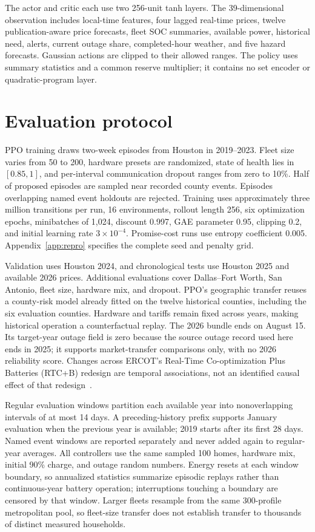 The actor and critic each use two 256-unit tanh layers. The 39-dimensional observation includes local-time features, four lagged real-time prices, twelve publication-aware price forecasts, fleet SOC summaries, available power, historical need, alerts, current outage share, completed-hour weather, and five hazard forecasts. Gaussian actions are clipped to their allowed ranges. The policy uses summary statistics and a common reserve multiplier; it contains no set encoder or quadratic-program layer.

\section{Evaluation protocol}
\label{sec:protocol}

PPO training draws two-week episodes from Houston in 2019--2023. Fleet size varies from 50 to 200, hardware presets are randomized, state of health lies in $[0.85,1]$, and per-interval communication dropout ranges from zero to 10\%. Half of proposed episodes are sampled near recorded county events. Episodes overlapping named event holdouts are rejected. Training uses approximately three million transitions per run, 16 environments, rollout length 256, six optimization epochs, minibatches of 1,024, discount 0.997, GAE parameter 0.95, clipping 0.2, and initial learning rate $3\times10^{-4}$. Promise-cost runs use entropy coefficient 0.005. Appendix~\ref{app:repro} specifies the complete seed and penalty grid.

Validation uses Houston 2024, and chronological tests use Houston 2025 and available 2026 prices. Additional evaluations cover Dallas--Fort Worth, San Antonio, fleet size, hardware mix, and dropout. PPO's geographic transfer reuses a county-risk model already fitted on the twelve historical counties, including the six evaluation counties. Hardware and tariffs remain fixed across years, making historical operation a counterfactual replay. The 2026 bundle ends on August 15. Its target-year outage field is zero because the source outage record used here ends in 2025; it supports market-transfer comparisons only, with no 2026 reliability score. Changes across ERCOT's Real-Time Co-optimization Plus Batteries (RTC+B) redesign are temporal associations, not an identified causal effect of that redesign~\citep{ercot_rtcb_2025}.

Regular evaluation windows partition each available year into nonoverlapping intervals of at most 14 days. A preceding-history prefix supports January evaluation when the previous year is available; 2019 starts after its first 28 days. Named event windows are reported separately and never added again to regular-year averages. All controllers use the same sampled 100 homes, hardware mix, initial 90\% charge, and outage random numbers. Energy resets at each window boundary, so annualized statistics summarize episodic replays rather than continuous-year battery operation; interruptions touching a boundary are censored by that window. Larger fleets resample from the same 300-profile metropolitan pool, so fleet-size transfer does not establish transfer to thousands of distinct measured households.

